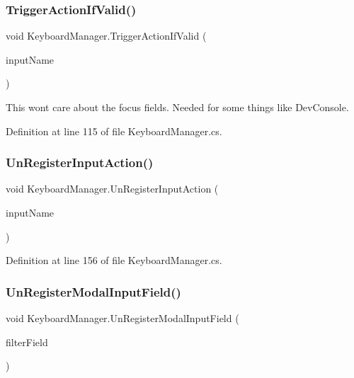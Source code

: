 \subsubsection{\texorpdfstring{Trigger\+Action\+If\+Valid()}{TriggerActionIfValid()}}
{\footnotesize\ttfamily void Keyboard\+Manager.\+Trigger\+Action\+If\+Valid (\begin{DoxyParamCaption}\item[{string}]{input\+Name }\end{DoxyParamCaption})}



This won\textquotesingle{}t care about the focus fields. Needed for some things like Dev\+Console. 



Definition at line 115 of file Keyboard\+Manager.\+cs.

\mbox{\label{class_keyboard_manager_a797f31873324867559c3aabf66e91fdd}} 
\subsubsection{\texorpdfstring{Un\+Register\+Input\+Action()}{UnRegisterInputAction()}}
{\footnotesize\ttfamily void Keyboard\+Manager.\+Un\+Register\+Input\+Action (\begin{DoxyParamCaption}\item[{string}]{input\+Name }\end{DoxyParamCaption})}



Definition at line 156 of file Keyboard\+Manager.\+cs.

\mbox{\label{class_keyboard_manager_a458b30dc7b22d0f068b9646c2db73063}} 
\subsubsection{\texorpdfstring{Un\+Register\+Modal\+Input\+Field()}{UnRegisterModalInputField()}}
{\footnotesize\ttfamily void Keyboard\+Manager.\+Un\+Register\+Modal\+Input\+Field (\begin{DoxyParamCaption}\item[{Input\+Field}]{filter\+Field }\end{DoxyParamCaption})}



